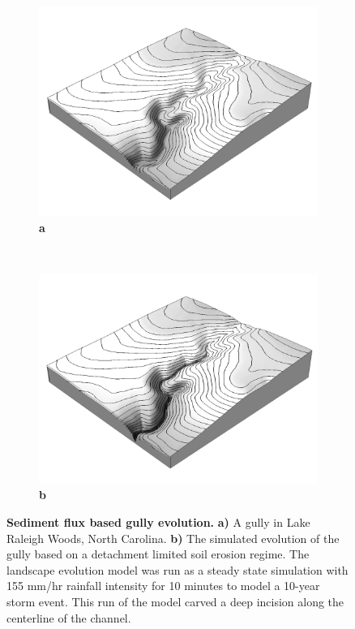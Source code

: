 \documentclass[final,3p,times,twocolumn]{elsarticle}
\begin{document}
\begin{figure}
\centering
%   
\begin{subfigure}[b]{0.4\textwidth}
\includegraphics[width=\textwidth]{images/dem.png}
\label{fig_2_1}
\textbf{a} \\
\end{subfigure}
%
~ %
%
\begin{subfigure}[b]{0.4\textwidth}
\includegraphics[width=\textwidth]{images/evolved_dem.png}
\label{fig_2_2}
\textbf{b} \\
\end{subfigure}
%
\caption{{\bf Sediment flux based gully evolution.}
\textbf{a)}
A gully in Lake Raleigh Woods, North Carolina.
\textbf{b)}
The simulated evolution of the gully based on a detachment limited soil erosion regime. 
The landscape evolution model was run as a steady state simulation with 155 mm/hr rainfall intensity for 10 minutes to model a 10-year storm event. 
This run of the model carved a deep incision along the centerline of the channel.
}
\label{fig_2}
\end{figure}
\end{document}
